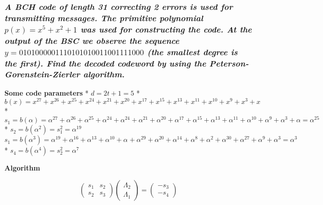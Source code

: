\documentclass[11pt]{article}
\begin{document}
    \hypertarget{a-bch-code-of-length-31-correcting-2-errors-is-used-for-transmitting-messages.-the-primitive-polynomial-px-x5-x2-1-was-used-for-constructing-the-code.-at-the-output-of-the-bsc-we-observe-the-sequence-y-0101000001110101010011001111000-the-smallest-degree-is-the-first.-find-the-decoded-codeword-by-using-the-peterson-gorenstein-zierler-algorithm.}{%
\subsubsection{\texorpdfstring{\emph{A BCH code of length 31 correcting
2 errors is used for transmitting messages. The primitive polynomial
\(p(x) = x^5 + x^2 + 1\) was used for constructing the code. At the
output of the BSC we observe the sequence
\(y = 0101000001110101010011001111000\) (the smallest degree is the
first). Find the decoded codeword by using the
Peterson-Gorenstein-Zierler
algorithm.}}{A BCH code of length 31 correcting 2 errors is used for transmitting messages. The primitive polynomial p(x) = x\^{}5 + x\^{}2 + 1 was used for constructing the code. At the output of the BSC we observe the sequence y = 0101000001110101010011001111000 (the smallest degree is the first). Find the decoded codeword by using the Peterson-Gorenstein-Zierler algorithm.}}\label{a-bch-code-of-length-31-correcting-2-errors-is-used-for-transmitting-messages.-the-primitive-polynomial-px-x5-x2-1-was-used-for-constructing-the-code.-at-the-output-of-the-bsc-we-observe-the-sequence-y-0101000001110101010011001111000-the-smallest-degree-is-the-first.-find-the-decoded-codeword-by-using-the-peterson-gorenstein-zierler-algorithm.}}

\textbf{Some code parameters} * \(d = 2t + 1 = 5\) *
\(b(x) = x^{27} + x^{26} + x^{25} + x^{24} + x^{21} + x^{20} + x^{17} + x^{15} + x^{13} + x^{11} + x^{10} + x^{9} + x^{3} + x\)
*
\(s_1 = b(α) = α^{27} + α^{26} + α^{25} + α^{24} + α^{24} + α^{21} + α^{20} + α^{17} + α^{15} + α^{13} + α^{11} + α^{10} + α^{9} + α^{3} + α = α^{25}\)
* \(s_2 = b(α^2) = s_1^2 = α^{19}\)
\(s_1 = b(α^3) = α^{19} + α^{16} + α^{13} + α^{10} + α^{} + α^{29} + α^{20} + α^{14} + α^{8} + α^{2} + α^{30} + α^{27} + α^{9} + α^{3} = α^{3}\)
* \(s_4 = b(α^4) = s_2^2 = α^{7}\)

\textbf{Algorithm}

\begin{equation}
\begin{pmatrix}
s_1 & s_2\\
s_2 & s_3
\end{pmatrix}
\begin{pmatrix}
Λ_2\\
Λ_1
\end{pmatrix}
=
\begin{pmatrix}
-s_3\\
-s_4
\end{pmatrix}
\end{equation}
\end{document}
